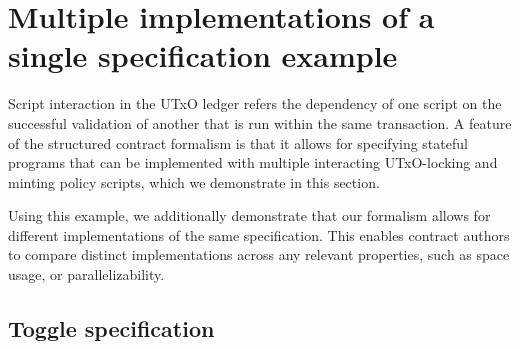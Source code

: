 \section{Multiple implementations of a single specification example}
\label{sec:toggle}

Script interaction in the UTxO ledger refers the dependency of one
script on the successful validation of another that is run within the same transaction.
A feature of the structured contract formalism is that
it allows for specifying stateful programs that can be implemented with
multiple interacting UTxO-locking and minting policy scripts, which we demonstrate
in this section.

Using this example, we additionally demonstrate that our formalism allows
for different implementations
of the same specification. This enables contract authors to compare
distinct implementations across any relevant properties, such as space usage,
or parallelizability.

\subsection{Toggle specification}

